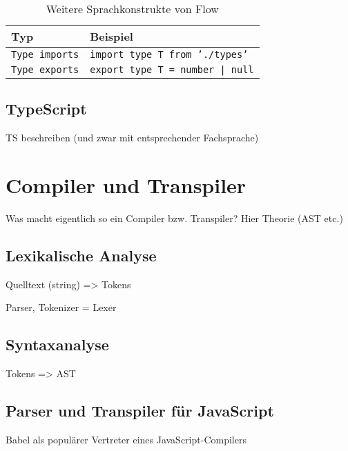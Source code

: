 \begin{table}
  \begin{tabular}{@{}ll@{}}
    \toprule
    \textbf{Typ}               & \textbf{Beispiel}                      \\
    \midrule
    \texttt{Type imports}     & \texttt{import type T from './types'}   \\
    \texttt{Type exports}     & \texttt{export type T = number | null}  \\
  \end{tabular}
  \caption{Weitere Sprachkonstrukte von Flow}
  \label{tab:flow-other-constructs}
\end{table}


\subsection{TypeScript}
  TS beschreiben (und zwar mit entsprechender Fachsprache)

\section{Compiler und Transpiler}

  Was macht eigentlich so ein Compiler bzw. Transpiler? Hier Theorie (AST etc.)


  \subsection{Lexikalische Analyse}

    Quelltext (string) => Tokens

    Parser, Tokenizer = Lexer

  \subsection{Syntaxanalyse}

    Tokens => AST


  \subsection{Parser und Transpiler für JavaScript}
  \label{subsec:js-transpilers}

    Babel als populärer Vertreter eines JavaScript-Compilers
